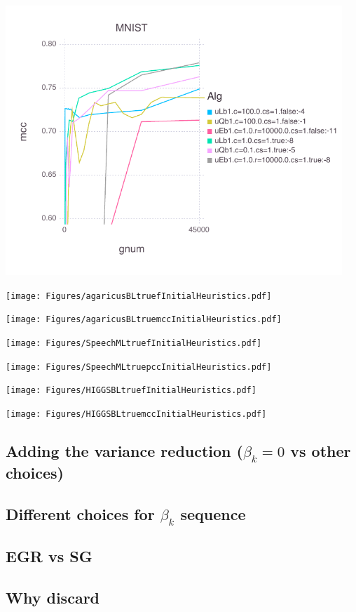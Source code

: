 \documentclass[11pt]{article}
\begin{document}
\includegraphics[width= 5in]{Figures/MNISTBLtruemccInitialHeuristics.pdf}

\texttt{[image: Figures/agaricusBLtruefInitialHeuristics.pdf]}

\texttt{[image: Figures/agaricusBLtruemccInitialHeuristics.pdf]}

\texttt{[image: Figures/SpeechMLtruefInitialHeuristics.pdf]}

\texttt{[image: Figures/SpeechMLtruepccInitialHeuristics.pdf]}

\texttt{[image: Figures/HIGGSBLtruefInitialHeuristics.pdf]}

\texttt{[image: Figures/HIGGSBLtruemccInitialHeuristics.pdf]}

\subsection{Adding the variance reduction ($\beta_k=0$ vs other choices)}

\subsection{Different choices for $\beta_k$ sequence}


\subsection{EGR vs SG}

\subsection{Why discard}
\end{document}
